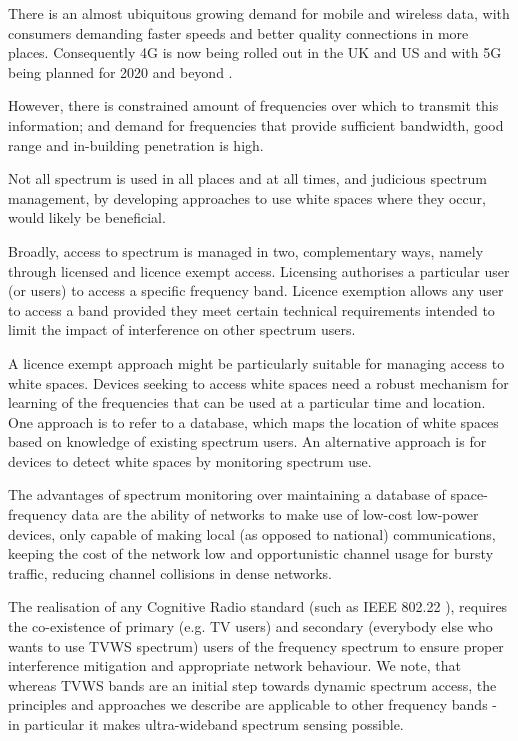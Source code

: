 \documentclass{article}
\begin{document}
There is an almost ubiquitous growing demand for mobile and wireless data, with consumers demanding faster speeds and better quality connections in more places. Consequently 4G is now being rolled out in the UK and US and with 5G being planned for 2020 and beyond \cite{Dahlman2014}.  

However, there is constrained amount of frequencies over which to transmit this information; and demand for frequencies that provide sufficient bandwidth, good range and in-building penetration is high.

Not all spectrum is used in all places and at all times, and judicious spectrum management, by developing approaches to use white spaces where they occur, would likely be beneficial.

Broadly, access to spectrum is managed in two, complementary ways, namely through licensed and licence exempt access. Licensing authorises a particular user (or users) to access a specific frequency band. Licence exemption allows any user to access a band provided they meet certain technical requirements intended to limit the impact of interference on other spectrum users.

A licence exempt approach might be particularly suitable for managing access to white spaces. Devices seeking to access white spaces need a robust mechanism for learning of the frequencies that can be used at a particular time and location. One approach is to refer to a database, which maps the location of white spaces based on knowledge of existing spectrum users. An alternative approach is for devices to detect white spaces by monitoring spectrum use. 

The advantages of spectrum monitoring \cite{akan2009cognitive} over maintaining a database of space-frequency data are the ability of networks to make use of low-cost low-power devices, only capable of making local (as opposed to national) communications, keeping the cost of the network low and  opportunistic channel usage for bursty traffic, reducing channel collisions in dense networks.

The realisation of any Cognitive Radio standard (such as IEEE 802.22 \cite{stevenson2009ieee}), requires the co-existence of primary (e.g. TV users) and secondary (everybody else who wants to use TVWS spectrum) users of the frequency spectrum to ensure proper interference mitigation and appropriate network behaviour. We note, that whereas TVWS bands are an initial step towards dynamic spectrum access, the principles and approaches we describe are applicable to other frequency bands - in particular it makes ultra-wideband spectrum sensing possible.
\end{document}
